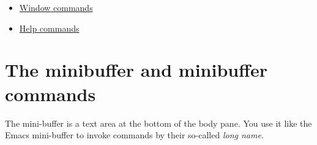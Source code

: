 \documentclass[a4paper,10pt,english]{sphinxmanual}
\begin{document}
{\begin{minipage}{0.95\linewidth}
\begin{itemize}
\begin{itemize}
\begin{itemize}
\item {} 
{\hyperref[commands:expanding-contracting-nodes]{Expanding \& contracting nodes}}

\item {} 
{\hyperref[commands:cutting-pasting-and-deleting-nodes]{Cutting, pasting and deleting nodes}}

\item {} 
{\hyperref[commands:navigating-through-the-outline]{Navigating through the outline}}

\item {} 
{\hyperref[commands:moving-reorganizing-nodes]{Moving \& Reorganizing nodes}}

\item {} 
{\hyperref[commands:cloning-nodes]{Cloning nodes}}

\item {} 
{\hyperref[commands:marking-nodes]{Marking nodes}}

\item {} 
{\hyperref[commands:dragging-nodes]{Dragging nodes}}

\item {} 
{\hyperref[commands:hoisting-de-hoisting-nodes]{Hoisting \& De-hoisting nodes}}

\item {} 
{\hyperref[commands:checking-outlines]{Checking outlines}}

\item {} 
{\hyperref[commands:resizing-panes]{Resizing panes}}

\end{itemize}

\item {} 
{\hyperref[commands:window-commands]{Window commands}}

\item {} 
{\hyperref[commands:id2]{Help commands}}

\end{itemize}

\end{itemize}
\end{minipage}}
\begin{center}\setlength{\fboxsep}{5pt}\end{center}


\section{The minibuffer and minibuffer commands}
\label{commands:the-minibuffer-and-minibuffer-commands}\label{commands:a-tutorial-introduction-to-leo}
The mini-buffer is a text area at the bottom of the body pane. You use it
like the Emacs mini-buffer to invoke commands by their so-called \emph{long name}.
\end{document}
